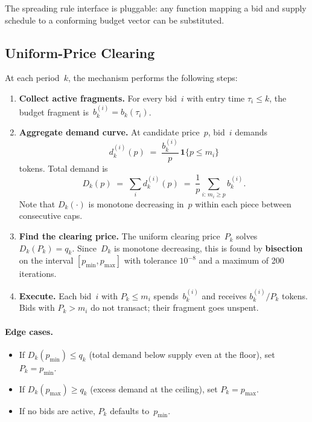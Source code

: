 \documentclass[11pt,a4paper]{article}
\newcommand{\Ind}{\mathbf{1}}
\begin{document}
The spreading rule interface is pluggable: any function mapping a bid and supply schedule to a conforming budget vector can be substituted.


\subsection{Uniform-Price Clearing}
\label{sec:clearing}

At each period~$k$, the mechanism performs the following steps:

\begin{enumerate}[nosep]
  \item \textbf{Collect active fragments.}  For every bid~$i$ with entry time $\tau_i \leq k$, the budget fragment is~$b_k^{(i)} = b_k(\tau_i)$.
  \item \textbf{Aggregate demand curve.}  At candidate price~$p$, bid~$i$ demands
  \[
    d_k^{(i)}(p) \;=\; \frac{b_k^{(i)}}{p}\,\Ind\{p \leq m_i\}
  \]
  tokens.  Total demand is
  \begin{equation}\label{eq:demand}
    D_k(p) \;=\; \sum_{i} d_k^{(i)}(p) \;=\; \frac{1}{p}\sum_{i:\,m_i \geq p} b_k^{(i)}.
  \end{equation}
  Note that $D_k(\cdot)$ is monotone decreasing in~$p$ within each piece between consecutive caps.

  \item \textbf{Find the clearing price.}  The uniform clearing price~$P_k$ solves $D_k(P_k) = q_k$.  Since~$D_k$ is monotone decreasing, this is found by \textbf{bisection} on the interval $[p_{\min}, p_{\max}]$ with tolerance $10^{-8}$ and a maximum of 200 iterations.

  \item \textbf{Execute.}  Each bid~$i$ with $P_k \leq m_i$ spends~$b_k^{(i)}$ and receives $b_k^{(i)} / P_k$ tokens.  Bids with $P_k > m_i$ do not transact; their fragment goes unspent.
\end{enumerate}

\paragraph{Edge cases.}
\begin{itemize}[nosep]
  \item If $D_k(p_{\min}) \leq q_k$ (total demand below supply even at the floor), set $P_k = p_{\min}$.
  \item If $D_k(p_{\max}) \geq q_k$ (excess demand at the ceiling), set $P_k = p_{\max}$.
  \item If no bids are active, $P_k$ defaults to~$p_{\min}$.
\end{itemize}
\end{document}
